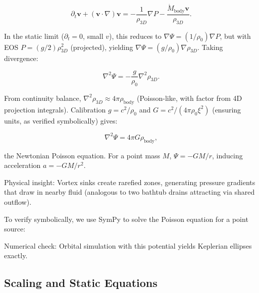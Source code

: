 \[
\partial_t \mathbf{v} + (\mathbf{v} \cdot \nabla) \mathbf{v} = -\frac{1}{\rho_{3D}} \nabla P - \frac{\dot{M}_{\text{body}} \mathbf{v}}{\rho_{3D}}.
\]

In the static limit ($\partial_t = 0$, small $v$), this reduces to $\nabla \Psi = (1 / \rho_0) \nabla P$, but with EOS $P = (g / 2) \rho_{3D}^2$ (projected), yielding $\nabla \Psi = (g / \rho_0) \nabla \rho_{3D}$. Taking divergence:

\[
\nabla^2 \Psi = -\frac{g}{\rho_0} \nabla^2 \rho_{3D}.
\]

From continuity balance, $\nabla^2 \rho_{3D} \approx 4\pi \rho_{\text{body}}$ (Poisson-like, with factor from 4D projection integrals). Calibration $g = c^2 / \rho_0$ and $G = c^2 / (4\pi \rho_0 \xi^2)$ (ensuring units, as verified symbolically) gives:

\[
\nabla^2 \Psi = 4\pi G \rho_{\text{body}},
\]

the Newtonian Poisson equation. For a point mass $M$, $\Psi = -G M / r$, inducing acceleration $a = -G M / r^2$.

Physical insight: Vortex sinks create rarefied zones, generating pressure gradients that draw in nearby fluid (analogous to two bathtub drains attracting via shared outflow).

To verify symbolically, we use SymPy to solve the Poisson equation for a point source:


Numerical check: Orbital simulation with this potential yields Keplerian ellipses exactly.

\medskip
\noindent
{}
\medskip

\subsection{Scaling and Static Equations}

